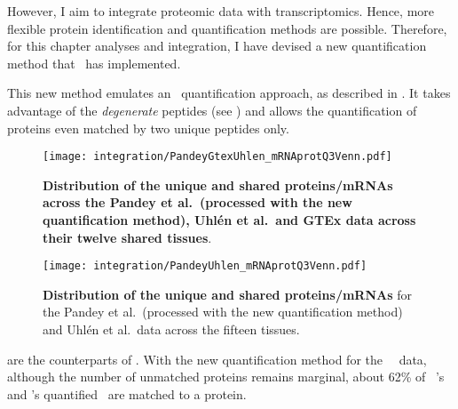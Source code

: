 However, I aim to integrate proteomic data with transcriptomics.
Hence, more flexible protein identification and quantification methods are possible.
Therefore, for this chapter analyses and integration,
I have devised a new quantification method that \james\ has implemented.%

This new method emulates an \Rnaseq\ quantification approach,
as described in .
It takes advantage of the \emph{degenerate} peptides (see )
and allows the quantification of proteins even matched by two unique peptides only.%

\begin{figure}[!ht]
    \texttt{[image: integration/PandeyGtexUhlen\_mRNAprotQ3Venn.pdf]}\centering
    \vspace{-4mm}
    \caption[Distribution of the unique and shared proteins/mRNAs
    across the three datasets and twelve tissues
    (with the new protein quantification method)]{\label{fig:PGU_venQ3}%
    \textbf{Distribution of the unique and shared proteins/mRNAs
    across the Pandey et al.\ (processed with the new quantification method),
    Uhlén et al.\ and GTEx data across their twelve shared tissues}.
    }
\end{figure}

\begin{figure}[!ht]
    \texttt{[image: integration/PandeyUhlen\_mRNAprotQ3Venn.pdf]}\centering
    \vspace{-4mm}
    \caption[Distribution of the unique and shared proteins/mRNAs for the
    Pandey et al.\ (processed with the new quantification method) and Uhlén et al.\ data
    across the fifteen tissues.
    ]{\label{fig:PU_vennQ3}\textbf{Distribution of the
    unique and shared proteins/mRNAs} for
    the Pandey et al.\ (processed with the new quantification method)
    and Uhlén et al.\ data across the fifteen tissues.}
\end{figure}

 are
the counterparts of .
With the new quantification method for the \pandey\ \etal\ data,
although the number of unmatched proteins remains marginal,
about 62\% of \uhlen\ \etal{}'s and \gtex{}'s quantified \mRNAs\
are matched to a protein.

